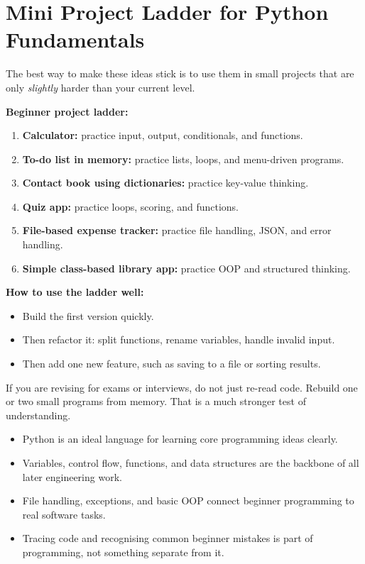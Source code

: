 \documentclass[12pt, a4paper, oneside]{book}
\begin{document}
\section{Mini Project Ladder for Python Fundamentals}

The best way to make these ideas stick is to use them in small projects that are only \emph{slightly} harder than your current level.

\begin{projectbox}
\textbf{Beginner project ladder:}
\begin{enumerate}[leftmargin=2em]
    \item \textbf{Calculator:} practice input, output, conditionals, and functions.
    \item \textbf{To-do list in memory:} practice lists, loops, and menu-driven programs.
    \item \textbf{Contact book using dictionaries:} practice key-value thinking.
    \item \textbf{Quiz app:} practice loops, scoring, and functions.
    \item \textbf{File-based expense tracker:} practice file handling, JSON, and error handling.
    \item \textbf{Simple class-based library app:} practice OOP and structured thinking.
\end{enumerate}
\end{projectbox}

\textbf{How to use the ladder well:}
\begin{itemize}[leftmargin=2em]
    \item Build the first version quickly.
    \item Then refactor it: split functions, rename variables, handle invalid input.
    \item Then add one new feature, such as saving to a file or sorting results.
\end{itemize}

\begin{examtipbox}
If you are revising for exams or interviews, do not just re-read code. Rebuild one or two small programs from memory. That is a much stronger test of understanding.
\end{examtipbox}

\begin{summarybox}
\begin{itemize}[leftmargin=2em]
    \item Python is an ideal language for learning core programming ideas clearly.
    \item Variables, control flow, functions, and data structures are the backbone of all later engineering work.
    \item File handling, exceptions, and basic OOP connect beginner programming to real software tasks.
    \item Tracing code and recognising common beginner mistakes is part of programming, not something separate from it.
\end{itemize}
\end{summarybox}
\end{document}
